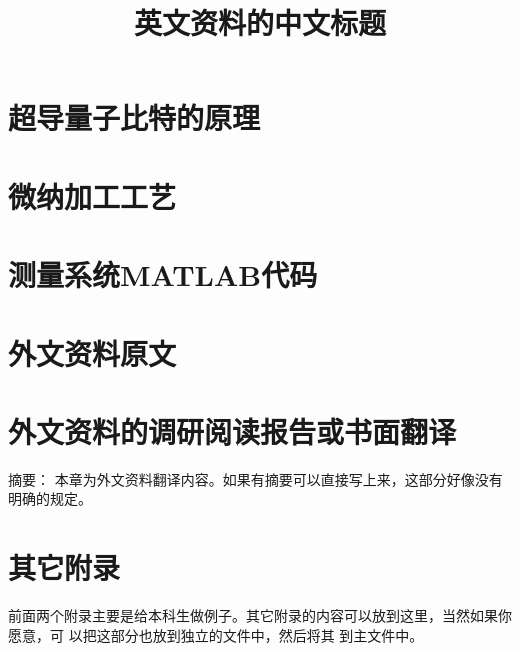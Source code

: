 
\chapter{超导量子比特的原理} %
\label{cha:SCQubitPrinciple}
  


\chapter{微纳加工工艺} %
\label{cha:fabrication}
  

\chapter{测量系统MATLAB代码} %
\label{cha:measurement_code}
  

\chapter{外文资料原文}
\label{cha:engorg}


\chapter{外文资料的调研阅读报告或书面翻译}

\title{英文资料的中文标题}

{\heiti 摘要：} 本章为外文资料翻译内容。如果有摘要可以直接写上来，这部分好像没有
明确的规定。


\chapter{其它附录}
前面两个附录主要是给本科生做例子。其它附录的内容可以放到这里，当然如果你愿意，可
以把这部分也放到独立的文件中，然后将其  到主文件中。
